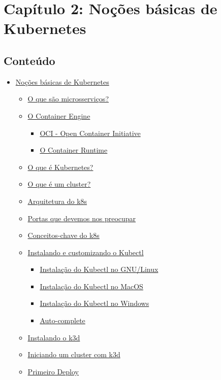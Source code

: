 \documentclass[12pt,a4paper]{article}
\begin{document}
\section*{Capítulo 2: Noções básicas de Kubernetes}

\subsection*{Conteúdo}
\begin{itemize}
  \item \hyperref[sec:basico]{Noções básicas de Kubernetes}
  \begin{itemize}
    \item \hyperref[sec:micro]{O que são microsserviços?}
    \item \hyperref[sec:engine]{O Container Engine}
    \begin{itemize}
      \item \hyperref[sec:oci]{OCI - Open Container Initiative}
      \item \hyperref[sec:runtime]{O Container Runtime}
    \end{itemize}
    \item \hyperref[sec:oquee]{O que é Kubernetes?}
    \item \hyperref[sec:cluster]{O que é um cluster?}
    \item \hyperref[sec:arq]{Arquitetura do k8s}
    \item \hyperref[sec:portas]{Portas que devemos nos preocupar}
    \item \hyperref[sec:conceitos]{Conceitos-chave do k8s}
    \item \hyperref[sec:kubectl]{Instalando e customizando o Kubectl}
    \begin{itemize}
      \item \hyperref[sec:kubectl_linux]{Instalação do Kubectl no GNU/Linux}
      \item \hyperref[sec:kubectl_mac]{Instalação do Kubectl no MacOS}
      \item \hyperref[sec:kubectl_win]{Instalação do Kubectl no Windows}
      \item \hyperref[sec:autocomplete]{Auto-complete}
    \end{itemize}
    \item \hyperref[sec:k3d]{Instalando o k3d}
    \item \hyperref[sec:k3d_cluster]{Iniciando um cluster com k3d}
    \item \hyperref[sec:deploy]{Primeiro Deploy}
    \begin{itemize}

\end{itemize}
\end{itemize}
\end{itemize}
\end{document}
